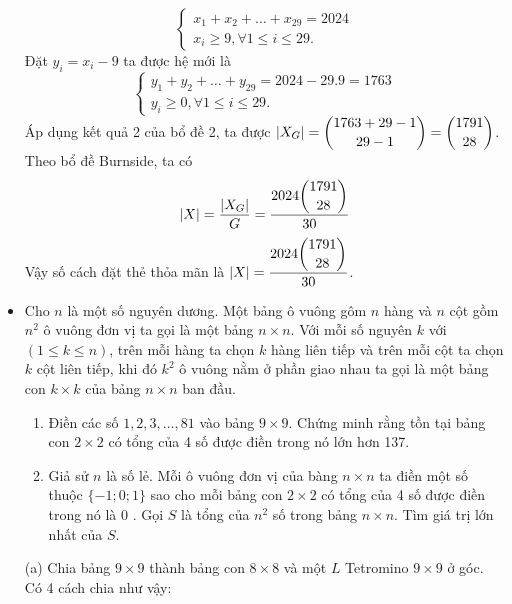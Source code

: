 \documentclass[11pt]{scrartcl}
\begin{document}
\begin{itemize}[label=, leftmargin=0em, itemsep=0.5em]
\begin{sol}
        \[
            \left\{
            \begin{array}{l}
                    x_1 + x_2 + \dots + x_{29} = 2024\\
                    x_i \geq 9, \forall 1 \leq i \leq 29.
            \end{array}
            \right.
        \]
        Đặt $y_i = x_i - 9$ ta được hệ mới là 
        \[
            \left\{
            \begin{array}{l}
                    y_1 + y_2 + \dots + y_{29} = 2024 - 29.9 = 1763\\
                    y_i \geq 0, \forall 1 \leq i \leq 29.
            \end{array}
            \right.
        \]
        Áp dụng kết quả 2 của bổ đề 2, ta được $|X_G| = \displaystyle\binom{1763 + 29 - 1}{29 - 1} = \displaystyle\binom{1791}{28}$.  Theo bổ đề Burnside, ta có 
        \[
            |X| = \frac{|X_G|}{G} = \frac{2024\dbi{1791}{28}}{30}
        \]
        Vậy số cách đặt thẻ thỏa mãn là $|X| = \frac{2024\dbi{1791}{28}}{30}$.
    \end{sol}
    \item \begin{bt}
        Cho $n$ là một số nguyên dương. Một bảng ô vuông gôm $n$ hàng và $n$ cột gồm $n^2$ ô vuông đơn vị ta gọi là một bảng $n \times n$.
        Với mỗi số nguyên $k$ với $(1 \leq k \leq n)$, trên mỗi hàng ta chọn $k$ hàng liên tiếp và trên mỗi cột ta chọn $k$ cột liên tiếp, khi đó $k^2$ ô vuông nằm ở phần giao nhau ta gọi là một bảng con $k \times k$ của bảng $n \times n$ ban đầu.
        \begin{enumerate}[label=(\alph*)]
            \item Điền các số $1,2,3, \ldots, 81$ vào bảng $9 \times 9$. Chứng minh rằng tồn tại bảng con $2 \times 2$ có tổng của 4 số được điền trong nó lớn hơn 137.
            \item Giả sử $n$ là số lẻ. Mỗi ô vuông đơn vị của bàng $n \times n$ ta điền một số thuộc $\{-1 ; 0 ; 1\}$ sao cho mỗi bảng con $2 \times 2$ có tổng của 4 số được điền trong nó là 0 . Gọi $S$ là tổng của $n^2$ số trong bảng $n \times n$. Tìm giá trị lớn nhất của $S$.
        \end{enumerate}
    \end{bt}
    \begin{sol}
        (a) Chia bảng $9 \times 9$ thành bảng con $8 \times 8$ và một $L$ Tetromino $9 \times 9$ ở góc. Có 4 cách chia như vậy:


\end{sol}
\end{itemize}
\end{document}
